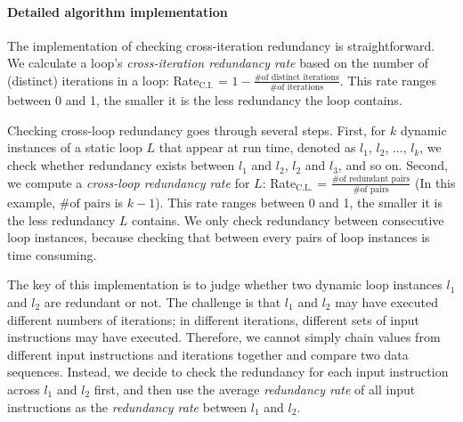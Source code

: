 


\paragraph{Detailed algorithm implementation}

The implementation of checking cross-iteration redundancy is straightforward.
We calculate a loop's \textit{cross-iteration redundancy rate} based on
the number of (distinct) iterations in a loop:
Rate$_\text{C.I.}$ = $1 - \frac{\text{\# of distinct iterations}}{\text{\# of iterations}}$.
This rate ranges between 0 and 1, the smaller it is
the less redundancy the loop contains.

Checking cross-loop redundancy goes through several
steps. First, for $k$ dynamic instances of a static loop $L$ that appear
at run time, denoted as $l_1$, $l_2$,
..., $l_k$, we check whether redundancy exists between $l_1$ and $l_2$, 
$l_2$ and $l_3$, and so on. Second, we compute a 
\textit{cross-loop redundancy rate} for $L$:
Rate$_\text{C.L.}$ = $\frac{\text{\# of redundant pairs}}{\text{\# of pairs}}$
(In this example, $\text{\# of pairs}$ is $k-1$).
This rate ranges between 0 and 1, the smaller it is the less redundancy
$L$ contains.
We only check redundancy between consecutive loop instances, because  
checking that between every pairs of loop
instances is time consuming.

The key of this implementation is
to judge whether two dynamic loop instances $l_1$ and $l_2$ 
are redundant or not.
The challenge is that $l_1$ and $l_2$ may have executed different numbers of
iterations; in different iterations, different sets of input instructions
may have executed. Therefore, we cannot simply chain values from different
input instructions and iterations together and compare two data sequences.
Instead, we decide to check the redundancy for each input instruction across
$l_1$ and $l_2$ first, and then use the average \textit{redundancy rate} of
all input instructions as the \textit{redundancy rate} between
$l_1$ and $l_2$. 

